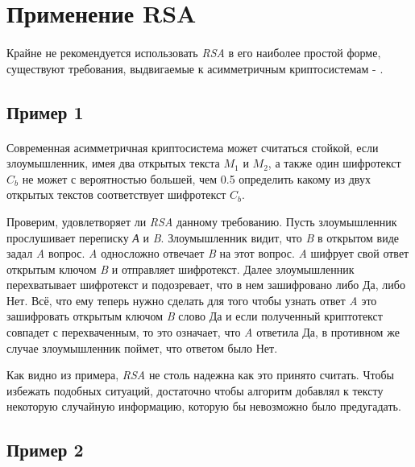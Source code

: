 
\section{Применение RSA}

\paragraph{} Крайне не рекомендуется использовать \textit{RSA} в его наиболее простой форме, существуют требования, выдвигаемые к асимметричным криптосистемам
- \cite[страницы 329-331]{may10}.

\subsection{Пример 1}

\paragraph{} Современная асимметричная криптосистема может считаться стойкой, если злоумышленник, имея два открытых текста {$M_1$} и 
  {$M_2$}, а также один шифротекст {$C_b$} не может с вероятностью большей, чем 0.5 определить какому из двух 
  открытых текстов соответствует шифротекст {$C_b$}.

  Проверим, удовлетворяет ли \textit{RSA} данному требованию. Пусть злоумышленник прослушивает переписку \textit{А} и \textit{B}. Злоумышленник видит, что 
  \textit{B} в открытом виде задал \textit{A} вопрос. \textit{A} односложно отвечает \textit{B} на этот вопрос. \textit{A} шифрует свой ответ открытым ключом
  \textit{B} и отправляет шифротекст. Далее злоумышленник перехватывает шифротекст и подозревает, что в нем зашифровано либо Да, либо Нет. Всё, что ему 
  теперь нужно сделать для того чтобы узнать ответ \textit{A} это зашифровать открытым ключом \textit{B} слово Да и если полученный криптотекст совпадет 
  с перехваченным, то это означает, что \textit{A} ответила Да, в противном же случае злоумышленник поймет, что ответом было Нет.

  Как видно из примера, \textit{RSA} не столь надежна как это принято считать. Чтобы избежать подобных ситуаций, достаточно чтобы алгоритм добавлял к 
  тексту некоторую случайную информацию, которую бы невозможно было предугадать. 

\subsection{Пример 2}

